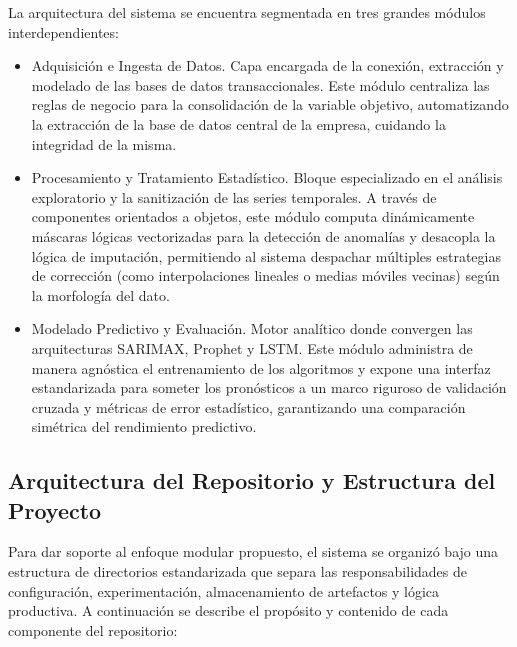 \documentclass[11pt,a4paper]{report}
\begin{document}
La arquitectura del sistema se encuentra segmentada en tres grandes módulos interdependientes:
\begin{itemize}
    \item Adquisición e Ingesta de Datos.
    Capa encargada de la conexión, extracción y modelado de las bases de datos transaccionales.
    Este módulo centraliza las reglas de negocio para la consolidación de la variable objetivo,
    automatizando la extracción de la base de datos central de la empresa, cuidando la integridad de la misma.

    \item Procesamiento y Tratamiento Estadístico.
    Bloque especializado en el análisis exploratorio y la sanitización de las series temporales.
    A través de componentes orientados a objetos, este módulo computa dinámicamente máscaras lógicas
    vectorizadas para la detección de anomalías y desacopla la lógica de imputación,
    permitiendo al sistema despachar múltiples estrategias de corrección (como interpolaciones lineales o medias móviles vecinas)
    según la morfología del dato.

    \item Modelado Predictivo y Evaluación.
    Motor analítico donde convergen las arquitecturas SARIMAX, Prophet y LSTM.
    Este módulo administra de manera agnóstica el entrenamiento de los algoritmos y expone
    una interfaz estandarizada para someter los pronósticos a un marco riguroso de validación cruzada
    y métricas de error estadístico, garantizando una comparación simétrica del rendimiento predictivo.
\end{itemize}

    \subsection{Arquitectura del Repositorio y Estructura del Proyecto}
    Para dar soporte al enfoque modular propuesto, el sistema se organizó bajo una estructura de directorios
    estandarizada que separa las responsabilidades de configuración, experimentación, almacenamiento de artefactos y
    lógica productiva. A continuación se describe el propósito y contenido de cada componente del repositorio:
\end{document}
